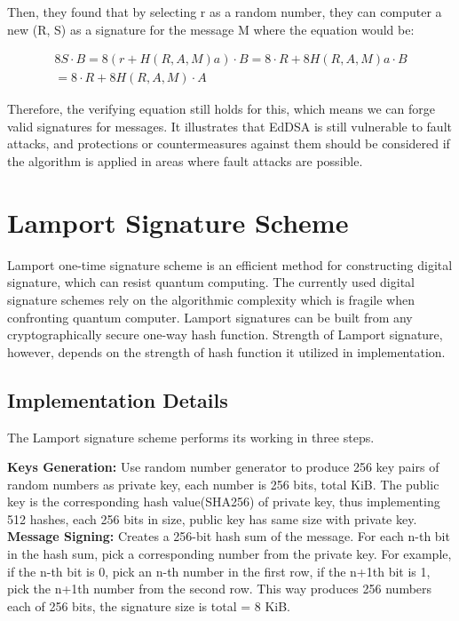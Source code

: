 \documentclass[10pt,sigconf]{acmart}
\begin{document}
Then, they found that by selecting r as a random number, they can computer a new (R, S) as a signature for the message M where the equation would be:

\begin{align*}
    8S \cdot B = 8(r + H(R,A,M) a) \cdot B = 8 \cdot R + 8H(R,A,M) a \cdot B \\
    = 8 \cdot R + 8H(R,A,M) \cdot A
\end{align*}


Therefore, the verifying equation still holds for this, which means we can forge valid signatures for messages. It illustrates that EdDSA is still vulnerable to fault attacks, and protections or countermeasures against them should be considered if the algorithm is applied in areas where fault attacks are possible.




\section{Lamport Signature Scheme}

Lamport one-time signature scheme is an efficient method for constructing digital signature, which can resist quantum computing. The currently used digital signature schemes rely on the algorithmic complexity which is fragile when confronting quantum computer. Lamport signatures can be built from any cryptographically secure one-way hash function. Strength of Lamport signature, however, depends on the strength of hash function it utilized in implementation.

\subsection{Implementation Details}

The Lamport signature scheme performs its working in three steps. 

\vspace{0.5em}

\noindent\textbf{Keys Generation:} \quad Use random number generator to produce 256 key pairs of random numbers as private key, each number is 256 bits, total  KiB. The public key is the corresponding hash value(SHA256) of private key, thus implementing 512 hashes, each 256 bits in size, public key has same size with private key.\\

\noindent\textbf{Message Signing:} \quad Creates a 256-bit hash sum of the message. For each n-th bit in the hash sum, pick a corresponding number from the private key. For example, if the n-th bit is 0, pick an n-th number in the first row, if the n+1th bit is 1, pick the n+1th number from the second row. This way produces 256 numbers each of 256 bits, the signature size is total  = 8 KiB.\\
\end{document}
